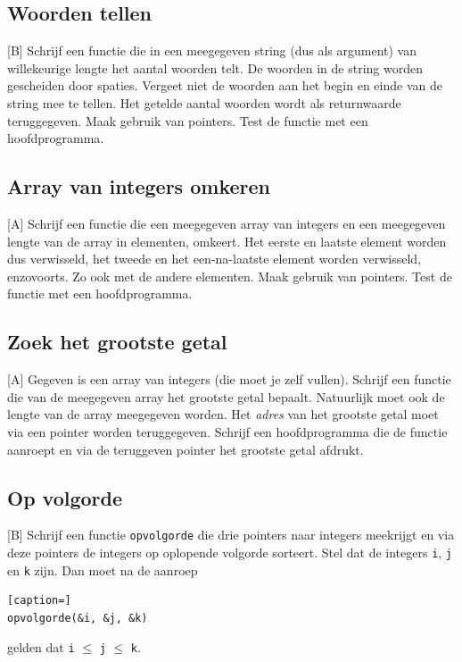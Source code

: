 \documentclass[a4paper,10pt,fleqn,twoside]{article}
\begin{document}
\subsection{Woorden tellen}[B]
Schrijf een functie die in een meegegeven string (dus als argument) van willekeurige lengte het aantal woorden telt. De woorden in de string worden gescheiden door spaties. Vergeet niet de woorden aan het begin en einde van de string mee te tellen. Het getelde aantal woorden wordt als returnwaarde teruggegeven. Maak gebruik van pointers. Test de functie met een hoofdprogramma.

\subsection{Array van integers omkeren}[A]
Schrijf een functie die een meegegeven array van integers en een meegegeven lengte van de array in elementen, omkeert. Het eerste en laatste element worden dus verwisseld, het tweede en het een-na-laatste element worden verwisseld, enzovoorts. Zo ook met de andere elementen. Maak gebruik van pointers. Test de functie met een hoofdprogramma.

\subsection{Zoek het grootste getal}[A]
Gegeven is een array van integers (die moet je zelf vullen). Schrijf een functie die van de meegegeven array het grootste getal bepaalt. Natuurlijk moet ook de lengte van de array meegegeven worden. Het \textsl{adres} van het grootste getal moet via een pointer worden teruggegeven. Schrijf een hoofdprogramma die de functie aanroept en via de teruggeven pointer het grootste getal afdrukt.

\subsection{Op volgorde}[B]
Schrijf een functie \lstinline|opvolgorde| die drie pointers naar integers meekrijgt en via deze pointers de integers op oplopende volgorde sorteert. Stel dat de integers \lstinline|i|, \lstinline|j| en \lstinline|k| zijn. Dan moet na de aanroep

\begin{lstlisting}[caption=]
opvolgorde(&i, &j, &k)
\end{lstlisting}

gelden dat \lstinline|i| $\leq$ \lstinline|j| $\leq$ \lstinline|k|.
\end{document}
